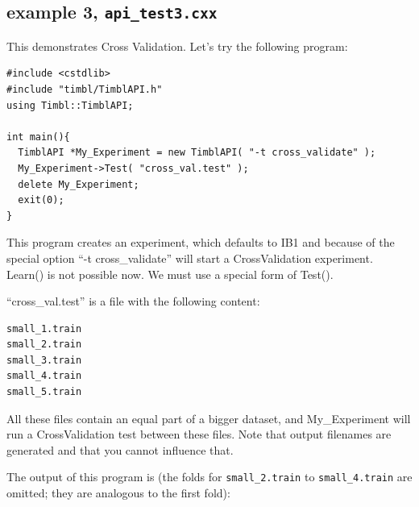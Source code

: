 \documentclass{report}
\begin{document}
\subsection{example 3, {\tt api\_test3.cxx}}

This demonstrates Cross Validation. Let's try the following program:

\begin{footnotesize}
\begin{verbatim}
#include <cstdlib>
#include "timbl/TimblAPI.h"
using Timbl::TimblAPI;

int main(){
  TimblAPI *My_Experiment = new TimblAPI( "-t cross_validate" );
  My_Experiment->Test( "cross_val.test" );
  delete My_Experiment;
  exit(0);
}
\end{verbatim}
\end{footnotesize}

This program creates an experiment, which defaults to IB1 and because of the
special option ``-t cross\_validate'' will start a CrossValidation
experiment.\\
Learn() is not possible now. We must use a special form of Test().

``cross\_val.test'' is a file with the following content:
\begin{footnotesize}
\begin{verbatim}
small_1.train
small_2.train
small_3.train
small_4.train
small_5.train
\end{verbatim}
\end{footnotesize}


All these files contain an equal part of a bigger dataset, and
My\_Experiment will run a CrossValidation test between these files.
Note that output filenames are generated and that you cannot influence
that.

The output of this program is (the folds for {\tt small\_2.train} to
{\tt small\_4.train} are omitted; they are analogous to the first
fold):
\end{document}
